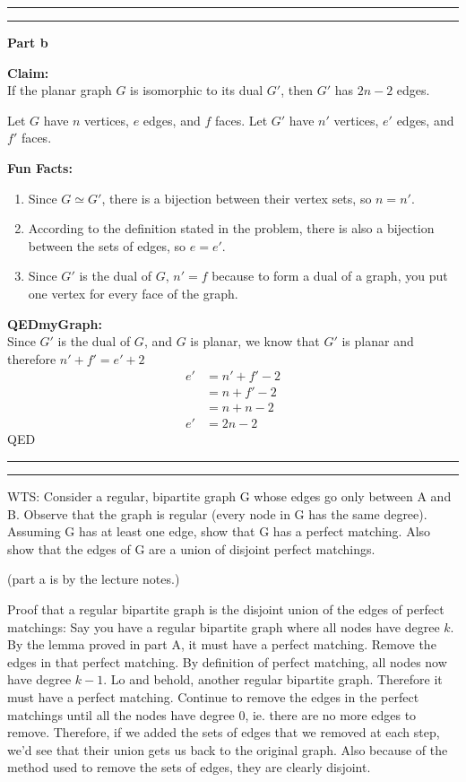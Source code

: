 \documentclass[11pt]{article}
\newcounter{questionCounter}
\newcounter{partCounter}[questionCounter]
\newenvironment{question}[2][\arabic{questionCounter}]{%
    \setcounter{partCounter}{0}%
    \vspace{.25in} \hrule \vspace{0.5em}%
        \noindent{\bf #2}%
    \vspace{0.8em} \hrule \vspace{.10in}%
    \addtocounter{questionCounter}{1}%
}{}
\begin{document}
\begin{question}{Like a fly in a web}
\textbf{Part b}

\textbf{Claim:}\\
If the planar graph $G$ is isomorphic to its dual $G'$, then $G'$ has $2n-2$ edges.

Let $G$ have $n$ vertices, $e$ edges, and $f$ faces.
Let $G'$ have $n'$ vertices, $e'$ edges, and $f'$ faces.

\textbf{Fun Facts:}
\begin{enumerate}
\item Since $G \simeq G'$, there is a bijection between their vertex sets, so $n=n'$.
\item According to the definition stated in the problem, there is also a bijection 
between the sets of edges, so $e=e'$.
\item Since $G'$ is the dual of $G$, $n' = f$ because to form a dual of a graph, you 
put one vertex for every face of the graph.
\end{enumerate}

\textbf{QEDmyGraph:}\\
Since $G'$ is the dual of $G$, and $G$ is planar, we know that $G'$ is planar
and therefore $n' + f' = e' + 2$
\begin{align*}
e' &= n' + f' - 2\\
   &= n + f' - 2\\
   &= n + n - 2\\
e' &= 2n - 2
\end{align*}
QED
\end{question}
\begin{question}{Oh no, not again}
WTS: Consider a regular, bipartite graph G whose edges go only between A and B. 
Observe that the graph is regular (every node in G has the same degree). 
Assuming G has at least one edge, show that G has a perfect matching.
Also show that the edges of G are a union of disjoint perfect matchings.

(part a is by the lecture notes.)

Proof that a regular bipartite graph is the disjoint union of the edges of perfect matchings:
Say you have a regular bipartite graph where all nodes have degree $k$. By the lemma proved in 
part A, it must have a perfect matching. Remove the edges in that perfect matching. By definition 
of perfect matching, all nodes now have degree $k-1$. Lo and behold, another regular bipartite graph. 
Therefore it must have a perfect matching. Continue to remove the edges in the perfect matchings 
until all the nodes have degree 0, ie. there are no more edges to remove. Therefore, if we added 
the sets of edges that we 
removed at each step, we'd see that their union gets us back to the original graph. Also
because of the method used to remove the sets of edges, they are clearly disjoint.

\end{question}
\end{document}

